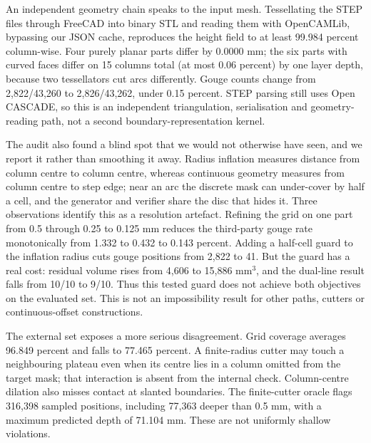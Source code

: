An independent geometry chain speaks to the input mesh. Tessellating the STEP files through FreeCAD into binary STL and reading them with OpenCAMLib, bypassing our JSON cache, reproduces the height field to at least 99.984 percent column-wise. Four purely planar parts differ by 0.0000 mm; the six parts with curved faces differ on 15 columns total (at most 0.06 percent) by one layer depth, because two tessellators cut arcs differently. Gouge counts change from 2,822/43,260 to 2,826/43,262, under 0.15 percent. STEP parsing still uses Open CASCADE, so this is an independent triangulation, serialisation and geometry-reading path, not a second boundary-representation kernel.

The audit also found a blind spot that we would not otherwise have seen, and we report it rather than smoothing it away. Radius inflation measures distance from column centre to column centre, whereas continuous geometry measures from column centre to step edge; near an arc the discrete mask can under-cover by half a cell, and the generator and verifier share the disc that hides it. Three observations identify this as a resolution artefact. Refining the grid on one part from 0.5 through 0.25 to 0.125 mm reduces the third-party gouge rate monotonically from 1.332 to 0.432 to 0.143 percent. Adding a half-cell guard to the inflation radius cuts gouge positions from 2,822 to 41. But the guard has a real cost: residual volume rises from 4,606 to 15,886 mm$^3$, and the dual-line result falls from 10/10 to 9/10. Thus this tested guard does not achieve both objectives on the evaluated set. This is not an impossibility result for other paths, cutters or continuous-offset constructions.

The external set exposes a more serious disagreement. Grid coverage averages 96.849 percent and falls to 77.465 percent. A finite-radius cutter may touch a neighbouring plateau even when its centre lies in a column omitted from the target mask; that interaction is absent from the internal check. Column-centre dilation also misses contact at slanted boundaries. The finite-cutter oracle flags 316,398 sampled positions, including 77,363 deeper than 0.5 mm, with a maximum predicted depth of 71.104 mm. These are not uniformly shallow violations.

